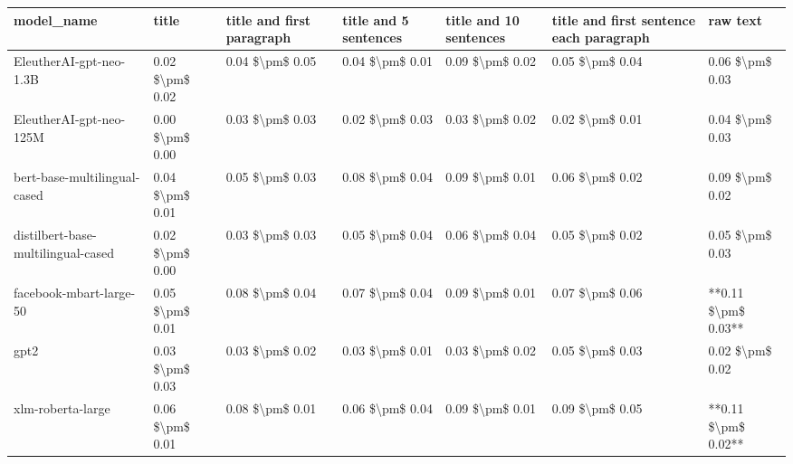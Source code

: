 \begin{tabular}{lllllll}
\toprule
                        model\_name &           title & title and first paragraph & title and 5 sentences & title and 10 sentences & title and first sentence each paragraph &            raw text \\
\midrule
           EleutherAI-gpt-neo-1.3B & 0.02 \$\textbackslash pm\$ 0.02 &           0.04 \$\textbackslash pm\$ 0.05 &       0.04 \$\textbackslash pm\$ 0.01 &        0.09 \$\textbackslash pm\$ 0.02 &                         0.05 \$\textbackslash pm\$ 0.04 &     0.06 \$\textbackslash pm\$ 0.03 \\
           EleutherAI-gpt-neo-125M & 0.00 \$\textbackslash pm\$ 0.00 &           0.03 \$\textbackslash pm\$ 0.03 &       0.02 \$\textbackslash pm\$ 0.03 &        0.03 \$\textbackslash pm\$ 0.02 &                         0.02 \$\textbackslash pm\$ 0.01 &     0.04 \$\textbackslash pm\$ 0.03 \\
      bert-base-multilingual-cased & 0.04 \$\textbackslash pm\$ 0.01 &           0.05 \$\textbackslash pm\$ 0.03 &       0.08 \$\textbackslash pm\$ 0.04 &        0.09 \$\textbackslash pm\$ 0.01 &                         0.06 \$\textbackslash pm\$ 0.02 &     0.09 \$\textbackslash pm\$ 0.02 \\
distilbert-base-multilingual-cased & 0.02 \$\textbackslash pm\$ 0.00 &           0.03 \$\textbackslash pm\$ 0.03 &       0.05 \$\textbackslash pm\$ 0.04 &        0.06 \$\textbackslash pm\$ 0.04 &                         0.05 \$\textbackslash pm\$ 0.02 &     0.05 \$\textbackslash pm\$ 0.03 \\
           facebook-mbart-large-50 & 0.05 \$\textbackslash pm\$ 0.01 &           0.08 \$\textbackslash pm\$ 0.04 &       0.07 \$\textbackslash pm\$ 0.04 &        0.09 \$\textbackslash pm\$ 0.01 &                         0.07 \$\textbackslash pm\$ 0.06 & **0.11 \$\textbackslash pm\$ 0.03** \\
                              gpt2 & 0.03 \$\textbackslash pm\$ 0.03 &           0.03 \$\textbackslash pm\$ 0.02 &       0.03 \$\textbackslash pm\$ 0.01 &        0.03 \$\textbackslash pm\$ 0.02 &                         0.05 \$\textbackslash pm\$ 0.03 &     0.02 \$\textbackslash pm\$ 0.02 \\
                 xlm-roberta-large & 0.06 \$\textbackslash pm\$ 0.01 &           0.08 \$\textbackslash pm\$ 0.01 &       0.06 \$\textbackslash pm\$ 0.04 &        0.09 \$\textbackslash pm\$ 0.01 &                         0.09 \$\textbackslash pm\$ 0.05 & **0.11 \$\textbackslash pm\$ 0.02** \\
\bottomrule
\end{tabular}
